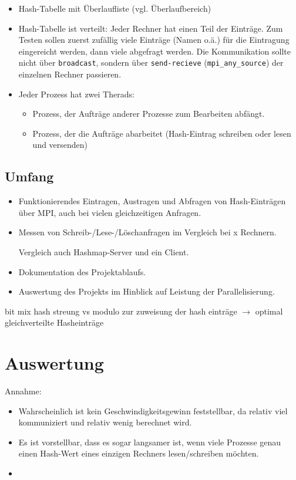 \documentclass{scrreprt}
\begin{document}
\begin{itemize}
\item Hash-Tabelle mit Überlaufliste (vgl. Überlaufbereich)
\item Hash-Tabelle ist verteilt: Jeder Rechner hat einen Teil der Einträge. Zum Testen sollen zuerst zufällig viele Einträge (Namen o.ä.) für die Eintragung eingereicht werden, dann viele abgefragt werden. Die Kommunikation sollte nicht über \lstinline`broadcast`, sondern über \lstinline`send-recieve` (\lstinline`mpi_any_source`) der einzelnen Rechner passieren.
\item Jeder Prozess hat zwei Therads: 
\begin{itemize}
\item Prozess, der Aufträge anderer Prozesse zum Bearbeiten abfängt.
\item Prozess, der die Aufträge abarbeitet (Hash-Eintrag schreiben oder lesen und versenden)
\end{itemize}
\end{itemize}

\section{Umfang}
\begin{itemize}
\item Funktionierendes Eintragen, Austragen und Abfragen von Hash-Einträgen über MPI, auch bei vielen gleichzeitigen Anfragen.
\item Messen von Schreib-/Lese-/Löschanfragen im Vergleich bei x Rechnern.%

Vergleich auch Hashmap-Server und ein Client.
\item Dokumentation des Projektablaufs.
\item Auswertung des Projekts im Hinblick auf Leistung der Parallelisierung.
\end{itemize}

bit mix hash streung vs modulo zur zuweisung der hash einträge $\to$ optimal gleichverteilte Hasheinträge

\chapter{Auswertung}

Annahme:
\begin{itemize}
\item Wahrscheinlich ist kein Geschwindigkeitsgewinn feststellbar, da relativ viel kommuniziert und relativ wenig berechnet wird.
\item Es ist vorstellbar, dass es sogar langsamer ist, wenn viele Prozesse genau einen Hash-Wert eines einzigen Rechners lesen/schreiben möchten.
\item 
\end{itemize}

\end{document}
